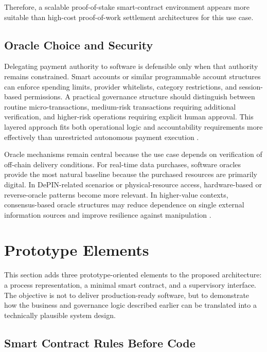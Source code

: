 \documentclass[12pt,a4paper,oneside]{article}
\theoremstyle{definition}
\theoremstyle{plain}
\begin{document}
Therefore, a scalable proof-of-stake smart-contract environment appears more suitable than high-cost proof-of-work settlement architectures for this use case.

\subsection{Oracle Choice and Security}

Delegating payment authority to software is defensible only when that authority remains constrained. Smart accounts or similar programmable account structures can enforce spending limits, provider whitelists, category restrictions, and session-based permissions. A practical governance structure should distinguish between routine micro-transactions, medium-risk transactions requiring additional verification, and higher-risk operations requiring explicit human approval. This layered approach fits both operational logic and accountability requirements more effectively than unrestricted autonomous payment execution \citep{krueger2026workshop7b,europeanunion2024aiact}.

Oracle mechanisms remain central because the use case depends on verification of off-chain delivery conditions.   For real-time data purchases, software oracles provide the most natural baseline because the purchased resources are primarily digital. In DePIN-related scenarios or physical-resource access, hardware-based or reverse-oracle patterns become more relevant. In higher-value contexts, consensus-based oracle structures may reduce dependence on single external information sources and improve resilience against manipulation \citep{krueger2026oracles}.

\section{Prototype Elements}

This section adds three prototype-oriented elements to the proposed architecture: a process representation, a minimal smart contract, and a supervisory interface. The objective is not to deliver production-ready software, but to demonstrate how the business and governance logic described earlier can be translated into a technically plausible system design.

\subsection{Smart Contract Rules Before Code}
\end{document}
